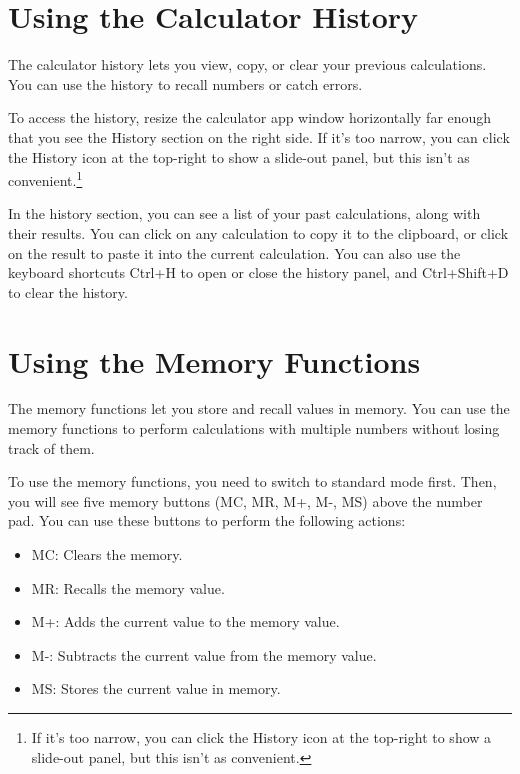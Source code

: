 \documentclass[12pt]{article}
\begin{document}
\pagebreak

\section{Using the Calculator History}

The calculator history lets you view, copy, or clear your previous calculations. You can use the history to recall numbers or catch errors.

To access the history, resize the calculator app window horizontally far enough that you see the History section on the right side. If it's too narrow, you can click the History icon at the top-right to show a slide-out panel, but this isn't as convenient.\footnote{If it's too narrow, you can click the History icon at the top-right to show a slide-out panel, but this isn't as convenient.}

In the history section, you can see a list of your past calculations, along with their results. You can click on any calculation to copy it to the clipboard, or click on the result to paste it into the current calculation. You can also use the keyboard shortcuts Ctrl+H to open or close the history panel, and Ctrl+Shift+D to clear the history.

\pagebreak

\section{Using the Memory Functions}
The memory functions let you store and recall values in memory. You can use the memory functions to perform calculations with multiple numbers without losing track of them.

To use the memory functions, you need to switch to standard mode first. Then, you will see five memory buttons (MC, MR, M+, M-, MS) above the number pad. You can use these buttons to perform the following actions:

\begin{itemize}
    \item MC: Clears the memory.
    \item MR: Recalls the memory value.
    \item M+: Adds the current value to the memory value.
    \item M-: Subtracts the current value from the memory value.
    \item MS: Stores the current value in memory.
\end{itemize}
\end{document}
